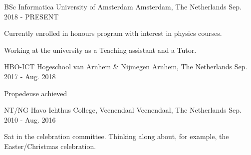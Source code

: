 


\begin{cventries}


\cventry
{BSc Informatica} %
{University of Amsterdam} %
{Amsterdam, The Netherlands} %
{Sep. 2018 - PRESENT} %
{ %
\begin{cvitems}
\item {Currently enrolled in honours program with interest in physics courses. }
\item {Working at the university as a Teaching assistant and a Tutor.}
\end{cvitems}
}


\cventry
{HBO-ICT} %
{Hogeschool van Arnhem \& Nijmegen} %
{Arnhem, The Netherlands} %
{Sep. 2017 - Aug. 2018} %
{ %
\begin{cvitems}
\item {Propedeuse achieved}
\end{cvitems}
}


\cventry
{NT/NG Havo} %
{Ichthus College, Veenendaal} %
{Veenendaal, The Netherlands} %
{Sep. 2010 - Aug. 2016} %
{ %
\begin{cvitems}
\item {Sat in the celebration committee. Thinking along about, for example, the Easter/Christmas celebration.}
\end{cvitems}
}


\end{cventries}